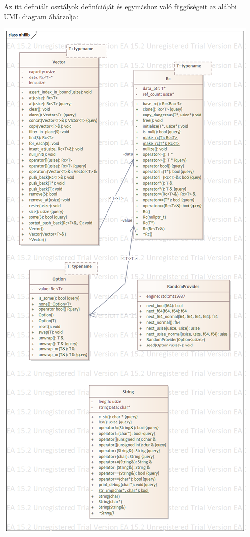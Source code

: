 \documentclass{article}[12pt,a4paper]
\begin{document}
    Az itt definiált osztályok definícióját és egymáshoz való függőségeit az alábbi UML diagram ábárzolja:
    \begin{center}
        \includegraphics[scale=0.55]{nhflib2}
    \end{center}
\end{document}
